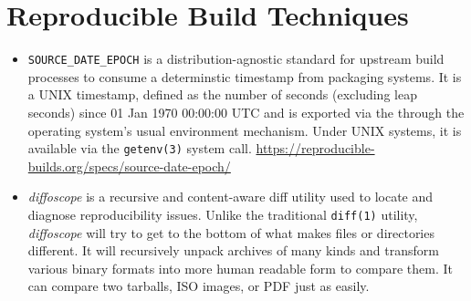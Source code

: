 \section{Reproducible Build Techniques}
\label{SEC:techniques}


\begin{itemize}

\item {\tt SOURCE\_DATE\_EPOCH} is a distribution-agnostic standard for upstream build processes to consume a determinstic timestamp from packaging systems. It is a UNIX timestamp, defined as the number of seconds (excluding leap seconds) since 01 Jan 1970 00:00:00 UTC and is exported via the through the operating system's usual environment mechanism. Under UNIX systems, it is available via the {\tt getenv(3)} system call. \url{https://reproducible-builds.org/specs/source-date-epoch/}

\item {\em diffoscope} is a recursive and content-aware diff utility used to locate and diagnose reproducibility issues. Unlike the traditional {\tt diff(1)} utility, {\em diffoscope} will try to get to the bottom of what makes files or directories different. It will recursively unpack archives of many kinds and transform various binary formats into more human readable form to compare them. It can compare two tarballs, ISO images, or PDF just as easily.

\end{itemize}
